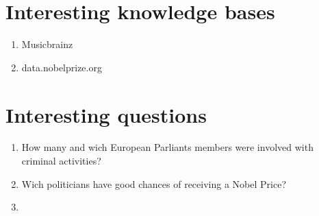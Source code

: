 \documentclass[11pt,a4paper]{article}
\begin{document}
\section{Interesting knowledge bases}
\begin{enumerate}

\item Musicbrainz
\item data.nobelprize.org

\end{enumerate}
\section{Interesting questions}
\begin{enumerate}
\item How many and wich European Parliants members were involved with criminal activities?
\item Wich politicians have good chances of receiving a Nobel Price?
\item  
\end{enumerate}
\end{document}
